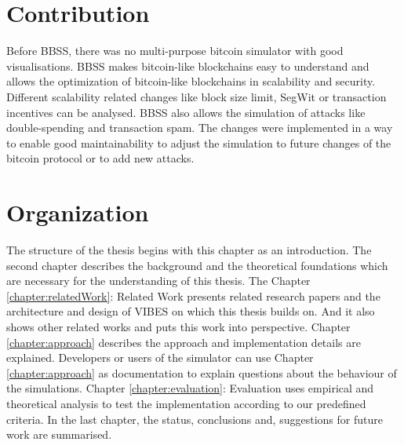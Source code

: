 \section{Contribution}
 \label{sec:contribution}
Before BBSS, there was no multi-purpose bitcoin simulator with good visualisations. BBSS makes bitcoin-like blockchains easy to understand and allows the optimization of bitcoin-like blockchains in scalability and security. Different scalability related changes like block size limit, SegWit or transaction incentives can be analysed. BBSS also allows the simulation of attacks like double-spending and transaction spam. The changes were implemented in a way to enable good maintainability to adjust the simulation to future changes of the bitcoin protocol or to add new attacks.

\section{Organization}
 \label{sec:organization}
The structure of the thesis begins with this chapter as an introduction. The second chapter describes the background and the theoretical foundations which are necessary for the understanding of this thesis. The Chapter \ref{chapter:relatedWork}: Related Work presents related research papers and the architecture and design of VIBES on which this thesis builds on. And it also shows other related works and puts this work into perspective. Chapter \ref{chapter:approach} describes the approach and implementation details are explained. Developers or users of the simulator can use Chapter \ref{chapter:approach} as documentation to explain questions about the behaviour of the simulations. Chapter \ref{chapter:evaluation}: Evaluation uses empirical and theoretical analysis to test the implementation according to our predefined criteria. In the last chapter, the status, conclusions and, suggestions for future work are summarised.

